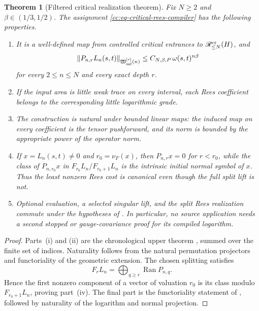 \documentclass[10pt,reqno]{amsart}
\theoremstyle{plain}
\newtheorem{theorem}{Theorem}[section]
\theoremstyle{definition}
\theoremstyle{remark}
\begin{document}
\begin{theorem}[Filtered critical realization theorem]
\label{cc:thm-critical-rees-compilation}
Fix \(N\ge2\) and \(\beta\in(1/3,1/2)\).  The assignment
\eqref{cc:eq-critical-rees-compiler} has the following properties.
\begin{enumerate}[label=\textup{(\roman*)},leftmargin=2.7em]
\item It is a well-defined map from controlled critical entrances to
\(\mathscr R^{\rm cr}_{\le N}(H)\), and
\begin{equation}
 \|P_{n,r}L_n(s,t)\|_{\mathfrak W^{[r]}_{\rm mf}(n)}
 \le C_{N,\beta,P}\,\omega(s,t)^{n\beta}
 \label{cc:eq-rees-coefficient-bound}
\end{equation}
for every \(2\le n\le N\) and every exact depth \(r\).
\item If the input area is little weak trace on every interval, each Rees
coefficient belongs to the corresponding little logarithmic grade.
\item The construction is natural under bounded linear maps: the induced
map on every coefficient is the tensor pushforward, and its norm is bounded
by the appropriate power of the operator norm.
\item If \(x=L_n(s,t)\ne0\) and \(r_0=\nu_F(x)\), then
\(P_{n,r}x=0\) for \(r<r_0\), while the class of
\(P_{n,r_0}x\) in \(F_{r_0}L_n/F_{r_0+1}L_n\) is the intrinsic initial
normal symbol of \(x\).  Thus the least nonzero Rees cost is canonical even
though the full split lift is not.
\item Optional evaluation, a selected singular lift, and the split Rees realization
commute under the hypotheses of
.  In particular, no source application needs a second stopped or
gauge-covariance proof for its compiled logarithm.
\end{enumerate}
\end{theorem}

\begin{proof}
Parts~\textup{(i)} and \textup{(ii)} are the chronological upper theorem
, summed over the finite set of
indices.  Naturality follows from the natural permutation projectors and
functoriality of the geometric extension.  The chosen splitting satisfies
\[
 F_rL_n=\bigoplus_{q\ge r}\operatorname{Ran}P_{n,q}.
\]
Hence the first nonzero component of a vector of valuation \(r_0\) is its
class modulo \(F_{r_0+1}L_n\), proving part~\textup{(iv)}.  The final part is the functoriality statement of
, followed by naturality of the
logarithm and normal projection.
\end{proof}
\end{document}
